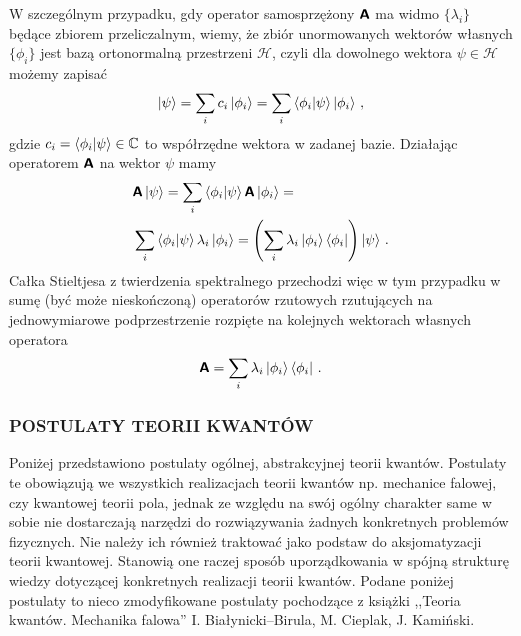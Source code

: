 \documentclass{myclass}
\begin{document}
W szczególnym przypadku, gdy operator samosprzężony \(\boldsymbol{\mathsf{A}}\) ma widmo \(\{\lambda_i\}\) będące
zbiorem przeliczalnym, wiemy, że zbiór unormowanych wektorów własnych \(\{\phi_i\}\) jest bazą
ortonormalną przestrzeni \(\mathscr{H}\), czyli dla dowolnego wektora \(\psi \in \mathscr{H}\)
możemy zapisać
\begin{equation*}
    \ket{\psi} = \sum_{i} c_i\ket{\phi_i} = \sum_{i} \braket{\phi_i}{\psi}\ket{\phi_i}\,,
\end{equation*}
gdzie \(c_i = \braket{\phi_i}{\psi} \in \mathbb{C}\) to współrzędne wektora w zadanej bazie.
Działając operatorem \(\boldsymbol{\mathsf{A}}\) na wektor \(\psi\) mamy
\begin{equation*}
    \begin{split}
        &\boldsymbol{\mathsf{A}}\ket{\psi} = \sum_{i} \braket{\phi_i}{\psi}\boldsymbol{\mathsf{A}}\ket{\phi_i} =\\
        &\sum_{i} \braket{\phi_i}{\psi}\lambda_i\ket{\phi_i} = \left(\sum_i\lambda_i\ket{\phi_i}\bra{\phi_i}\right)\ket{\psi} \,.
    \end{split}
\end{equation*}
Całka Stieltjesa z twierdzenia spektralnego przechodzi więc w tym przypadku w sumę (być może
nieskończoną) operatorów rzutowych rzutujących na jednowymiarowe podprzestrzenie rozpięte na
kolejnych wektorach własnych operatora
\begin{equation*}
    \boldsymbol{\mathsf{A}} = \sum_{i} \lambda_i \ket{\phi_i}\bra{\phi_i}\,.
\end{equation*}

\subsubsection{POSTULATY TEORII KWANTÓW}

Poniżej przedstawiono postulaty ogólnej, abstrakcyjnej teorii kwantów. Postulaty te obowiązują we
wszystkich realizacjach teorii kwantów np. mechanice falowej, czy kwantowej teorii pola, jednak ze
względu na swój ogólny charakter same w sobie nie dostarczają narzędzi do rozwiązywania żadnych
konkretnych problemów fizycznych. Nie należy ich również traktować jako podstaw do aksjomatyzacji
teorii kwantowej. Stanowią one raczej sposób uporządkowania w spójną strukturę wiedzy dotyczącej
konkretnych realizacji teorii kwantów. Podane poniżej postulaty to nieco zmodyfikowane postulaty
pochodzące z książki ,,Teoria kwantów. Mechanika falowa'' I. Białynicki--Birula, M. Cieplak, J.
Kamiński.
\medskip
\end{document}
